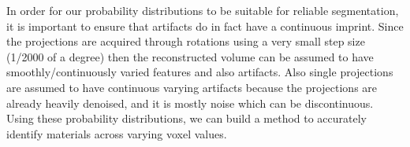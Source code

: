 In order for our probability distributions to be suitable for reliable
segmentation,  it is important to ensure that artifacts do in fact have a
continuous imprint.  Since the projections are acquired through rotations using
a very small step size (1/2000 of a degree) then the reconstructed volume can
be assumed to have smoothly/continuously varied features and also artifacts.
Also single projections are assumed to have continuous varying artifacts
because the projections are already heavily denoised, and it is mostly noise
which can be discontinuous. Using these probability distributions, we can build
a method to accurately identify materials across varying voxel values.


